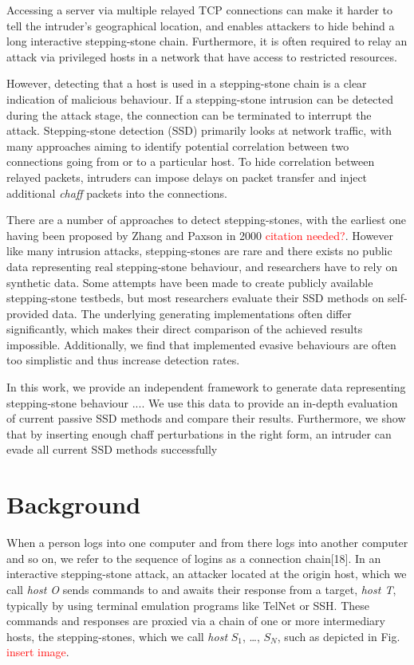 \documentclass[conference]{IEEEtran}\usepackage[]{graphicx}\usepackage[]{color}
\begin{document}
Accessing a server via multiple relayed TCP connections can make it harder to tell the intruder's geographical location, and enables attackers to hide behind a long interactive stepping-stone chain. Furthermore, it is often required to relay an attack via privileged hosts in a network that have access to restricted resources. 

However, detecting that a host is used in a stepping-stone chain is a clear indication of malicious behaviour. If a stepping-stone intrusion can be detected during the attack stage, the connection can be terminated to interrupt the attack. Stepping-stone detection (SSD) primarily looks at network traffic, with many approaches aiming to identify potential correlation between two connections going from or to a particular host. To hide correlation between relayed packets, intruders can impose delays on packet transfer and inject additional \textit{chaff} packets into the connections.

There are a number of approaches to detect stepping-stones, with the earliest one having been proposed by Zhang and Paxson in 2000 \textcolor{red}{citation needed?}. However like many intrusion attacks, stepping-stones are rare and there exists no public data representing real stepping-stone behaviour, and researchers have to rely on synthetic data. Some attempts have been made to create publicly available stepping-stone testbeds, but most researchers evaluate their SSD methods on self-provided data. The underlying generating implementations often differ significantly, which makes their direct comparison of the achieved results impossible. Additionally, we find that implemented evasive behaviours are often too simplistic and thus increase detection rates. 

In this work, we provide an independent framework to generate data representing stepping-stone behaviour ....
We use this data to provide an in-depth evaluation of current passive SSD methods and compare their results. Furthermore, we show that by inserting enough chaff perturbations in the right form, an intruder can evade all current SSD methods successfully


\section{Background}

When a person logs into one computer and from there logs into another computer and so on, we refer to the sequence of logins as a connection chain[18]. 
In an interactive stepping-stone attack, an attacker located at the origin host, which we call \textit{host O} sends commands to and awaits their response from a target, \textit{host T}, typically by using terminal emulation programs like TelNet or SSH. These commands and responses are proxied via a chain of one or more intermediary hosts, the stepping-stones, which we call \textit{host} $S_1$, \dots, $S_N$, such as depicted in Fig. \textcolor{red}{insert image}. 
\end{document}
